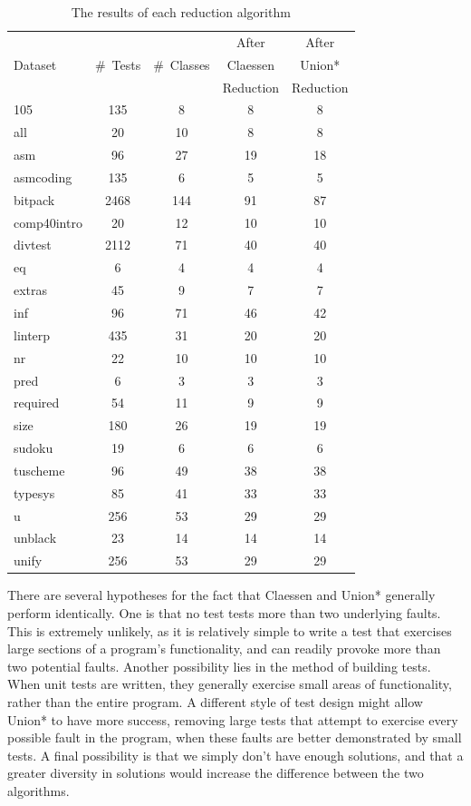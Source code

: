 \documentclass[11pt,twoside]{article}
\theoremstyle{definition}
\begin{document}
\begin{table}[t]
\def\?{\phantom0}
\centering

\begin{tabular}{ | l | c | c | c | c | }
\hline
        &          &             &   After   & After \\ 
Dataset & \#~Tests & \#\ Classes &  Claessen &  Union*  \\ 
     &            &             & Reduction & Reduction \\
\hline
105 & \?135 & \?\?8 & \?8 & \?8 \\
all & \?\?20 & \?10 & \?8 & \?8 \\
asm & \?\?96 & \?27 & 19 & 18 \\
asmcoding & \?135 & \?\?6 & \?5 & \?5 \\
bitpack & 2468 & 144 & 91 & 87 \\
comp40intro & \?\?20 & \?12 & 10 & 10 \\
divtest & 2112 & \?71 & 40 & 40 \\
eq & \?\?\?6 & \?\?4 & \?4 & \?\?4 \\
extras & \?\?45 & \?\?9 & \?7 & \?7 \\
inf & \?\?96 & \?71 & 46 & 42 \\
linterp & \?435 & \?31 & 20 & 20 \\
nr & \?\?22 & \?10 & 10 & 10 \\
pred & \?\?\?6 & \?\?3 & \?3 & \?3 \\
required & \?\?54 & \?11 & \?9 & \?9 \\
size & \?180 & \?26 & 19 & 19 \\
sudoku & \?19 & \?\?6 & \?6 & \?6 \\
tuscheme & \?\?96 & \?49 & 38 & 38 \\
typesys & \?\?85 & \?41 & 33 & 33 \\
u & \?256 & \?53 & 29 & 29 \\
unblack & \?23 & \?14 & 14 & 14 \\
unify & \?256 & \?53 & 29 & 29 \\
\hline
\end{tabular}
\caption{The results of each reduction algorithm}
\end{table}

There are several hypotheses for the fact that Claessen and Union* generally perform identically. One is that no test tests more than two underlying faults. This is extremely unlikely, as it is relatively simple to write a test that exercises large sections of a program's functionality, and can readily provoke more than two potential faults. Another possibility lies in the method of building tests. When unit tests are written, they generally exercise small areas of functionality, rather than the entire program. A different style of test design might allow Union* to have more success, removing large tests that attempt to exercise every possible fault in the program, when these faults are better demonstrated by small tests. A final possibility is that we simply don't have enough solutions, and that a greater diversity in solutions would increase the difference between the two algorithms.
\end{document}
